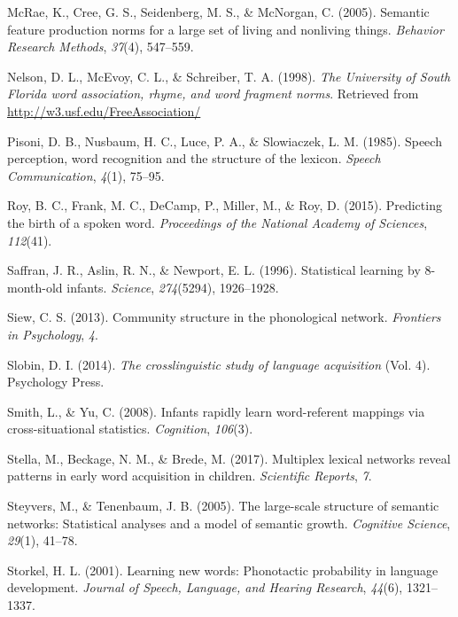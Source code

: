 \documentclass[english,floatsintext,man]{apa6}
\theoremstyle{definition}
\theoremstyle{definition}
\theoremstyle{definition}
\theoremstyle{remark}
\begin{document}
\hypertarget{ref-mcrae2005}{}
McRae, K., Cree, G. S., Seidenberg, M. S., \& McNorgan, C. (2005).
Semantic feature production norms for a large set of living and
nonliving things. \emph{Behavior Research Methods}, \emph{37}(4),
547--559.

\hypertarget{ref-nelson1998}{}
Nelson, D. L., McEvoy, C. L., \& Schreiber, T. A. (1998). \emph{The
University of South Florida word association, rhyme, and word fragment
norms}. Retrieved from \url{http://w3.usf.edu/FreeAssociation/}

\hypertarget{ref-pisoni1985}{}
Pisoni, D. B., Nusbaum, H. C., Luce, P. A., \& Slowiaczek, L. M. (1985).
Speech perception, word recognition and the structure of the lexicon.
\emph{Speech Communication}, \emph{4}(1), 75--95.

\hypertarget{ref-roy2015}{}
Roy, B. C., Frank, M. C., DeCamp, P., Miller, M., \& Roy, D. (2015).
Predicting the birth of a spoken word. \emph{Proceedings of the National
Academy of Sciences}, \emph{112}(41).

\hypertarget{ref-saffran1996}{}
Saffran, J. R., Aslin, R. N., \& Newport, E. L. (1996). Statistical
learning by 8-month-old infants. \emph{Science}, \emph{274}(5294),
1926--1928.

\hypertarget{ref-siew2013}{}
Siew, C. S. (2013). Community structure in the phonological network.
\emph{Frontiers in Psychology}, \emph{4}.

\hypertarget{ref-slobin2014}{}
Slobin, D. I. (2014). \emph{The crosslinguistic study of language
acquisition} (Vol. 4). Psychology Press.

\hypertarget{ref-smith2008}{}
Smith, L., \& Yu, C. (2008). Infants rapidly learn word-referent
mappings via cross-situational statistics. \emph{Cognition},
\emph{106}(3).

\hypertarget{ref-stella2017}{}
Stella, M., Beckage, N. M., \& Brede, M. (2017). Multiplex lexical
networks reveal patterns in early word acquisition in children.
\emph{Scientific Reports}, \emph{7}.

\hypertarget{ref-steyvers2005}{}
Steyvers, M., \& Tenenbaum, J. B. (2005). The large-scale structure of
semantic networks: Statistical analyses and a model of semantic growth.
\emph{Cognitive Science}, \emph{29}(1), 41--78.

\hypertarget{ref-storkel2001}{}
Storkel, H. L. (2001). Learning new words: Phonotactic probability in
language development. \emph{Journal of Speech, Language, and Hearing
Research}, \emph{44}(6), 1321--1337.
\end{document}
